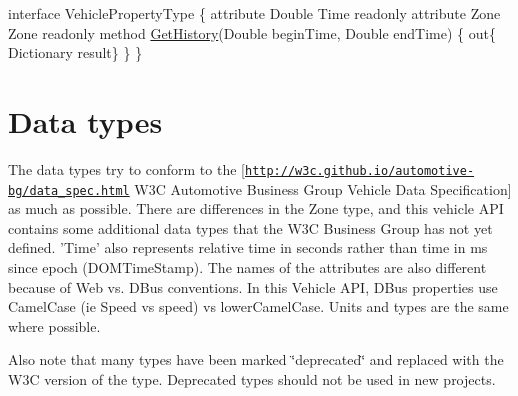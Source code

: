 \begin{DoxyCode}
\textcolor{keyword}{interface }VehiclePropertyType \{
  attribute Double Time readonly
  attribute Zone Zone readonly
  method \hyperlink{amb_8fidl_aea9b81502a85e8451cb2de497511ce5c}{GetHistory}(Double beginTime, Double endTime) \{
    out\{ Dictionary result\}
  \}
\}
\end{DoxyCode}
\hypertarget{index_data_types}{}\section{Data types}\label{index_data_types}
The data types try to conform to the \mbox{[}\href{http://w3c.github.io/automotive-bg/data_spec.html}{\tt http\+://w3c.\+github.\+io/automotive-\/bg/data\+\_\+spec.\+html} W3\+C Automotive Business Group Vehicle Data Specification\mbox{]} as much as possible. There are differences in the Zone type, and this vehicle A\+P\+I contains some additional data types that the W3\+C Business Group has not yet defined. 'Time' also represents relative time in seconds rather than time in ms since epoch (D\+O\+M\+Time\+Stamp). The names of the attributes are also different because of Web vs. D\+Bus conventions. In this Vehicle A\+P\+I, D\+Bus properties use Camel\+Case (ie Speed vs speed) vs lower\+Camel\+Case. Units and types are the same where possible.

Also note that many types have been marked \char`\"{}deprecated\char`\"{} and replaced with the W3\+C version of the type. Deprecated types should not be used in new projects. 